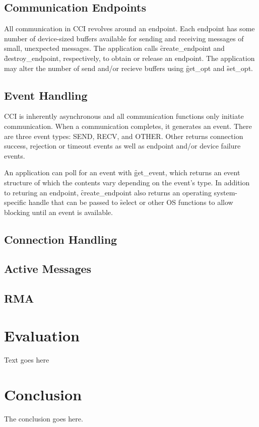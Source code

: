 \documentclass[conference]{IEEEtran}
\begin{document}
\subsection{Communication Endpoints}

All communication in CCI revolves around an endpoint. Each endpoint has some number of
device-sized buffers available for sending and receiving messages of small, unexpected
messages. The application calls \f{create\_endpoint} and \f{destroy\_endpoint},
respectively, to obtain or release an endpoint. The application may alter the number of
send and/or recieve buffers using \f{get\_opt} and \f{set\_opt}.

\subsection{Event Handling}
CCI is inherently asynchronous and all communication functions only initiate
communication. When a communication completes, it generates an event. There are three
event types: SEND, RECV, and OTHER. Other returns connection success, rejection or timeout
events as well as endpoint and/or device failure events.

An application can poll for an event with \f{get\_event}, which returns an event structure of
which the contents vary depending on the event's type. In addition to returing an
endpoint, \f{create\_endpoint} also returns an operating system-specific handle that can
be passed to \f{select} or other OS functions to allow blocking until an event is
available.

\subsection{Connection Handling}

\subsection{Active Messages}

\subsection{RMA}

\section{Evaluation}
Text goes here

\section{Conclusion}
The conclusion goes here.
\end{document}
